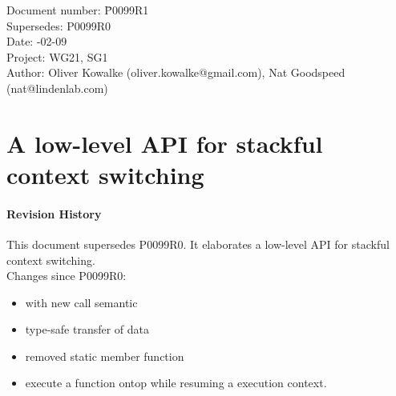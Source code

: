 \documentclass[paper=A4,pagesize,DIV=15]{scrartcl}
\begin{document}
\small
\begin{tabbing}
    Document number: \= P0099R1\\
    Supersedes:      \> P0099R0\\
    Date:            -02-09\\
    Project:         \> WG21, SG1\\
    Author:          \> Oliver Kowalke (oliver.kowalke@gmail.com), Nat Goodspeed (nat@lindenlab.com)\\
\end{tabbing}

\section*{A low-level API for stackful context switching}


\tableofcontents


\paragraph*{Revision History}
This document supersedes P0099R0. It elaborates a low-level API for stackful
context switching.\\
\newline
Changes since P0099R0:

\begin{itemize}
    \item \ectx with new call semantic
    \item type-safe transfer of data
    \item removed static member function 
    \item execute a function ontop while resuming a execution context.
\end{itemize}










\end{document}
